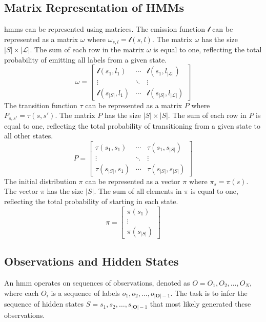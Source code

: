 \subsection{Matrix Representation of HMMs}\label{subsec:matrix-representation}
\glspl{hmm} can be represented using matrices.
The emission function $\mathscr{l}$ can be represented as a matrix $\omega$ where $\omega_{s, l} = \mathscr{l}(s, l)$.
The matrix $\omega$ has the size $|S| \times |\mathcal{L}|$.
The sum of each row in the matrix $\omega$ is equal to one, reflecting the total probability of emitting all labels from a given state.
\[
\omega = \begin{bmatrix}
    \mathscr{l}(s_1, l_1) & \cdots & \mathscr{l}(s_1, l_{|\mathcal{L}|}) \\
    \vdots & \ddots & \vdots \\
    \mathscr{l}(s_{|S|}, l_1)  & \cdots & \mathscr{l}(s_{|S|}, l_{|\mathcal{L}|})
\end{bmatrix}
\]
The transition function $\tau$ can be represented as a matrix $P$ where $P_{s, s'} = \tau(s, s')$.
The matrix $P$ has the size $|S| \times |S|$.
The sum of each row in $P$ is equal to one, reflecting the total probability of transitioning from a given state to all other states.
\[
P = \begin{bmatrix}
    \tau(s_1, s_1) &  \cdots & \tau(s_1, s_{|S|}) \\
    \vdots  & \ddots & \vdots \\
    \tau(s_{|S|}, s_1) & \cdots & \tau(s_{|S|}, s_{|S|})
\end{bmatrix}
\]
The initial distribution $\pi$ can be represented as a vector $\pi$ where $\pi_s = \pi(s)$.
The vector $\pi$ has the size $|S|$.
The sum of all elements in $\pi$ is equal to one, reflecting the total probability of starting in each state.
\[
\pi = \begin{bmatrix}
    \pi(s_1) \\
    \vdots \\
    \pi(s_{|S|})
\end{bmatrix} 
\]

\subsection{Observations and Hidden States}\label{subsec:observations-hidden-states}
An \gls{hmm} operates on sequences of observations, denoted as $O = {O_1, O_2, \ldots, O_N}$, where each $O_i$ is a sequence of labels $o_1, o_2, \ldots, o_{|\textbf{O}|-1}$.
The task is to infer the sequence of hidden states $S = s_1, s_2, \ldots, s_{|\textbf{O}|-1}$ that most likely generated these observations.

